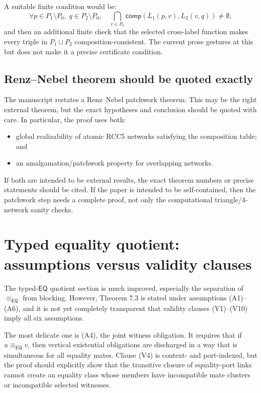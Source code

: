 \documentclass[11pt]{article}
\newcommand{\EQ}{\mathsf{EQ}}
\newcommand{\comp}{\mathsf{comp}}
\newcommand{\eqEQ}{\equiv_{\EQ}}
\begin{document}
A suitable finite condition would be:
\[
\forall p\in P_1\setminus P_0,\; q\in P_2\setminus P_0,
\quad
\bigcap_{v\in P_0}\comp(L_1(p,v),L_2(v,q)) \neq \emptyset,
\]
and then an additional finite check that the selected cross-label function makes every triple in $P_1\cup P_2$ composition-consistent.  The current prose gestures at this but does not make it a precise certificate condition.

\subsection{Renz--Nebel theorem should be quoted exactly}

The manuscript restates a Renz--Nebel patchwork theorem.  This may be the right external theorem, but the exact hypotheses and conclusion should be quoted with care.  In particular, the proof uses both:
\begin{itemize}[leftmargin=2em]
  \item global realizability of atomic RCC5 networks satisfying the composition table; and
  \item an amalgamation/patchwork property for overlapping networks.
\end{itemize}
If both are intended to be external results, the exact theorem numbers or precise statements should be cited.  If the paper is intended to be self-contained, then the patchwork step needs a complete proof, not only the computational triangle/4-network sanity checks.

\section{Typed equality quotient: assumptions versus validity clauses}

The typed-$\EQ$ quotient section is much improved, especially the separation of $\eqEQ$ from blocking.  However, Theorem 7.3 is stated under assumptions (A1)--(A6), and it is not yet completely transparent that validity clauses (V1)--(V10) imply all six assumptions.

The most delicate one is (A4), the joint witness obligation.  It requires that if $u\eqEQ v$, then vertical existential obligations are discharged in a way that is simultaneous for all equality mates.  Clause (V4) is context- and port-indexed, but the proof should explicitly show that the transitive closure of equality-port links cannot create an equality class whose members have incompatible mate clusters or incompatible selected witnesses.
\end{document}

